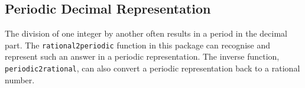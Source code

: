 
\subsection{Periodic Decimal Representation}

The division of one integer by another often results in
a period in the decimal part. The \texttt{rational2periodic}
function in this package can recognise and represent
such an answer in a periodic representation. The inverse
function, \texttt{periodic2rational}, can also convert a
periodic representation back to a rational number.

\hypertarget{operator:RATIONAL2PERIODIC}{}
\hypertarget{operator:PERIODIC2RATIONAL}{}
\hypertarget{operator:RATIONAL}{}


